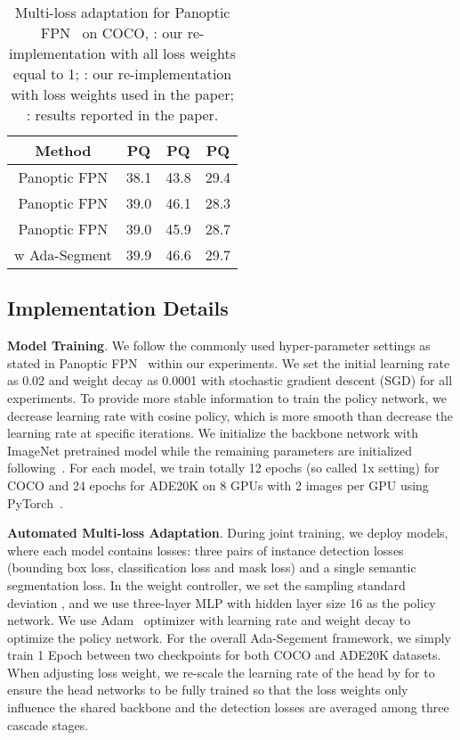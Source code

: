 \documentclass[letterpaper]{article} \usepackage{aaai21}  \usepackage{times}  \usepackage{helvet} \usepackage{courier}  \usepackage[hyphens]{url}  \usepackage{graphicx} \urlstyle{rm} \def\UrlFont{\rm}  \usepackage{natbib}  \usepackage{caption} \frenchspacing  \setlength{\pdfpagewidth}{8.5in}  \setlength{\pdfpageheight}{11in}
\begin{document}
  \begin{table}[t]
    \begin{centering}
    \tabcolsep 0.05in\renewcommand{\arraystretch}{1.2}{\footnotesize{}}\begin{tabular}{c|ccc}
    \hline 
    Method & PQ & PQ & PQ\tabularnewline
    \hline 
    Panoptic FPN & 38.1 & 43.8 & 29.4\tabularnewline
    Panoptic FPN & 39.0 & 46.1 & 28.3\tabularnewline
    Panoptic FPN & 39.0 & 45.9 & 28.7\tabularnewline
    w Ada-Segment & 39.9 & 46.6 & 29.7\tabularnewline
    \hline 
    \end{tabular}{\footnotesize\par}
    \par\end{centering}
\caption{\label{tab:Evaluation-on-panopticfpn}Multi-loss adaptation for Panoptic FPN~\cite{panopticFPNkirillov2019} on COCO, 
    : our re-implementation with all loss weights equal to 1; : our re-implementation
    with loss weights used in the paper; : results reported in the paper.}
\end{table}    


 \subsection{Implementation Details}
 \noindent
 \textbf{Model Training}. We follow the commonly used hyper-parameter settings as stated in 
 Panoptic FPN~\cite{panopticFPNkirillov2019} within our experiments. 
 We set the initial learning rate as 0.02
 and weight decay as 0.0001 with stochastic gradient descent
 (SGD) for all experiments. 
 To provide more stable information to train the policy network, we decrease learning
 rate with cosine policy, which is more smooth than decrease the learning
 rate at specific iterations. We initialize the backbone network with ImageNet
 pretrained model while the remaining parameters are initialized following~\cite{he2015init}. 
 For each model, we train totally 12 epochs (so called 1x setting) for COCO 
 and 24 epochs for ADE20K 
 on 8 GPUs with 2 images per GPU using PyTorch~\cite{paszke2017automatic}.


 \noindent
 \textbf{Automated Multi-loss Adaptation}. 
 During joint training, we deploy  models, where each model contains  losses:
 three pairs of instance detection losses (bounding box loss, classification
 loss and mask loss) and a single semantic segmentation loss.
 In the weight controller, we set the sampling standard deviation ,
 and we use three-layer MLP with hidden 
 layer size 16 as the policy network. We use Adam~\cite{kingma2014adam} optimizer with learning rate 
  and weight decay  to optimize the policy network. 
 For the overall Ada-Segement framework, we simply train 1 Epoch between two checkpoints for both COCO 
 and ADE20K datasets. When adjusting loss weight, we re-scale the learning rate of the  head by  
 for  to ensure the head networks to be fully trained so that the loss weights only
 influence the shared backbone and the detection losses are averaged among three cascade stages.  
 
\end{document}
